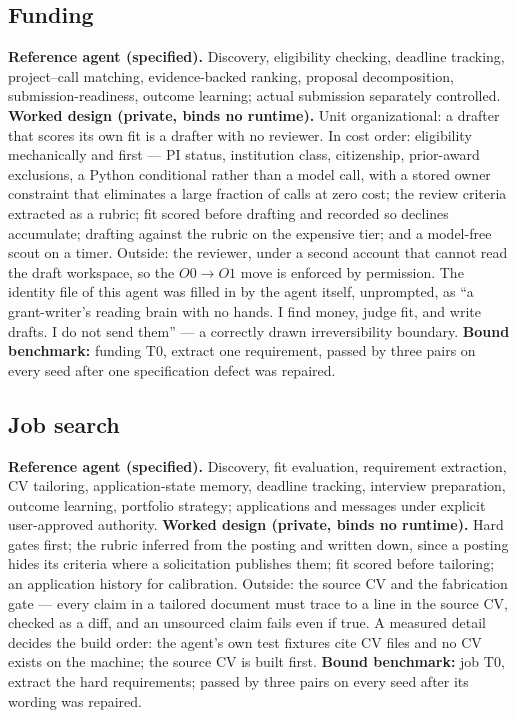 \documentclass[11pt]{article}
\theoremstyle{definition}
\begin{document}
\subsection{Funding}

\textbf{Reference agent (specified).} Discovery, eligibility checking, deadline tracking, project--call matching, evidence-backed ranking, proposal decomposition, submission-readiness, outcome learning; actual submission separately controlled. \textbf{Worked design (private, binds no runtime).} Unit organizational: a drafter that scores its own fit is a drafter with no reviewer. In cost order: eligibility mechanically and first --- PI status, institution class, citizenship, prior-award exclusions, a Python conditional rather than a model call, with a stored owner constraint that eliminates a large fraction of calls at zero cost; the review criteria extracted as a rubric; fit scored before drafting and recorded so declines accumulate; drafting against the rubric on the expensive tier; and a model-free scout on a timer. Outside: the reviewer, under a second account that cannot read the draft workspace, so the $O0 \to O1$ move is enforced by permission. The identity file of this agent was filled in by the agent itself, unprompted, as ``a grant-writer's reading brain with no hands. I find money, judge fit, and write drafts. I do not send them'' --- a correctly drawn irreversibility boundary. \textbf{Bound benchmark:} funding T0, extract one requirement, passed by three pairs on every seed after one specification defect was repaired.

\subsection{Job search}

\textbf{Reference agent (specified).} Discovery, fit evaluation, requirement extraction, CV tailoring, application-state memory, deadline tracking, interview preparation, outcome learning, portfolio strategy; applications and messages under explicit user-approved authority. \textbf{Worked design (private, binds no runtime).} Hard gates first; the rubric inferred from the posting and written down, since a posting hides its criteria where a solicitation publishes them; fit scored before tailoring; an application history for calibration. Outside: the source CV and the fabrication gate --- every claim in a tailored document must trace to a line in the source CV, checked as a diff, and an unsourced claim fails even if true. A measured detail decides the build order: the agent's own test fixtures cite CV files and no CV exists on the machine; the source CV is built first. \textbf{Bound benchmark:} job T0, extract the hard requirements; passed by three pairs on every seed after its wording was repaired.
\end{document}
